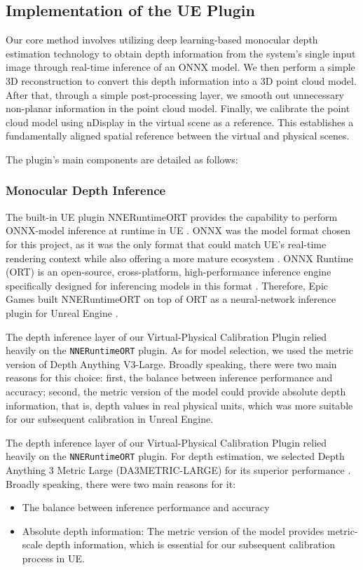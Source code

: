 \documentclass[conference]{IEEEtran}
\begin{document}
\subsection{Implementation of the UE Plugin}
Our core method involves utilizing deep learning-based monocular depth estimation technology to obtain depth information from the system's single input image through real-time inference of an ONNX model. We then perform a simple 3D reconstruction to convert this depth information into a 3D point cloud model. After that, through a simple post-processing layer, we smooth out unnecessary non-planar information in the point cloud model. Finally, we calibrate the point cloud model using nDisplay in the virtual scene as a reference. This establishes a fundamentally aligned spatial reference between the virtual and physical scenes.

The plugin's main components are detailed as follows:

\subsubsection{Monocular Depth Inference}
The built-in UE plugin NNERuntimeORT provides the capability to perform ONNX-model inference at runtime in UE \cite{EpicNNERuntimeORT}. ONNX was the model format chosen for this project, as it was the only format that could match UE's real-time rendering context while also offering a more mature ecosystem \cite{ONNXIntro}. ONNX Runtime (ORT) is an open-source, cross-platform, high-performance inference engine specifically designed for inferencing models in this format \cite{ONNXRuntimeInference}. Therefore, Epic Games built NNERuntimeORT on top of ORT as a neural-network inference plugin for Unreal Engine \cite{EpicNNERuntimeORT}.

The depth inference layer of our Virtual-Physical Calibration Plugin relied heavily on the \texttt{NNERuntimeORT} plugin. As for model selection, we used the metric version of Depth Anything V3-Large. Broadly speaking, there were two main reasons for this choice: first, the balance between inference performance and accuracy; second, the metric version of the model could provide absolute depth information, that is, depth values in real physical units, which was more suitable for our subsequent calibration in Unreal Engine.

The depth inference layer of our Virtual-Physical Calibration Plugin relied heavily on the \texttt{NNERuntimeORT} plugin. For depth estimation, we selected Depth Anything 3 Metric Large (DA3METRIC-LARGE) for its superior performance \cite{DepthAnything3MetricLarge}. Broadly speaking, there were two main reasons for it:
\begin{itemize}
    \item The balance between inference performance and accuracy
    \item Absolute depth information: The metric version of the model provides metric-scale depth information, which is essential for our subsequent calibration process in UE.
\end{itemize}
\end{document}
